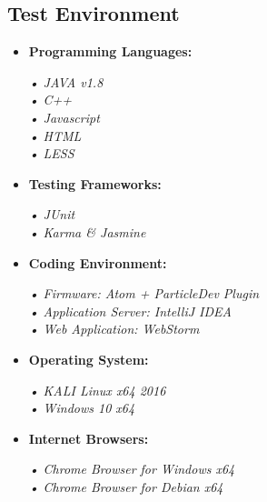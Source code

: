\documentclass[a4paper,10pt]{article}
\begin{document}
		\subsection{Test Environment}
		\begin{itemize}
			\item \textbf{Programming Languages:}
				\begin{flushleft}
					\textit{
					• JAVA v1.8\\
					• C++\\
					• Javascript\\
					• HTML\\
					• LESS\\}
				\end{flushleft}
				
			\item\textbf{Testing Frameworks:}
				\begin{flushleft}
					\textit{• JUnit\\
					• Karma \& Jasmine\\
						}
				\end{flushleft}
				
			\item\textbf{Coding Environment:}
			\begin{flushleft}
				\textit{• Firmware: Atom + ParticleDev Plugin\\
					• Application Server: IntelliJ IDEA\\
					• Web Application: WebStorm\\}
			\end{flushleft}
			
			\item\textbf{Operating System:}
			\begin{flushleft}
				\textit{• KALI Linux x64 2016\\
					• Windows 10 x64}
			\end{flushleft}
			\item\textbf{Internet Browsers:}
			\begin{flushleft}
				\textit{• Chrome Browser for Windows x64\\
					• Chrome Browser for Debian x64}
			\end{flushleft}
		\end{itemize}
		
\end{document}
